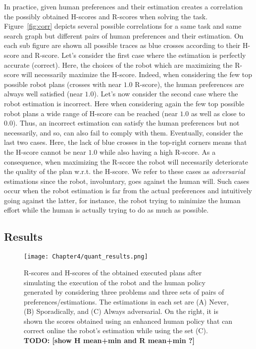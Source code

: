 In practice, given human preferences and their estimation creates a correlation the possibly obtained H-scores and R-scores when solving the task. Figure~\ref{fig:corr} depicts several possible correlations for a same task and same search graph but different pairs of human preferences and their estimation. On each sub figure are shown all possible traces as blue crosses according to their H-score and R-score. 
Let's consider the first case where the estimation is perfectly accurate (correct). Here, the choices of the robot which are maximizing the R-score will necessarily maximize the H-score. Indeed, when considering the few top possible robot plans (crosses with near $1.0$ R-score), the human preferences are always well satisfied (near $1.0$). 
Let's now consider the second case where the robot estimation is incorrect. Here when considering again the few top possible robot plans a wide range of H-score can be reached (near $1.0$ as well as close to $0.0$). Thus, an incorrect estimation can satisfy the human preferences but not necessarily, and so, can also fail to comply with them.
Eventually, consider the last two cases. Here, the lack of blue crosses in the top-right corners means that the H-score cannot be near $1.0$ while also having a high R-score. As a consequence, when maximizing the R-score the robot will necessarily deteriorate the quality of the plan w.r.t. the H-score. We refer to these cases as \textit{adversarial} estimations since the robot, involuntary, goes against the human will. Such cases occur when the robot estimation is far from the actual preferences and intuitively going against the latter, for instance, the robot trying to minimize the human effort while the human is actually trying to do as much as possible.  

    \subsection{Results}

\begin{figure}
    \centering
    \texttt{[image: Chapter4/quant\_results.png]}
    \caption{
    R-scores and H-scores of the obtained executed plans after simulating the execution of the robot and the human policy generated by considering three problems and three sets of pairs of preferences/estimations. 
    The estimations in each set are (A) Never, (B) Sporadically, and (C) Always adversarial. On the right, it is shown the scores obtained using an enhanced human policy that can correct online the robot's estimation while using the set (C). \textbf{TODO: [show H mean+min and R mean+min ?]}
    }    
    \label{fig:heatmaps}
\end{figure}

